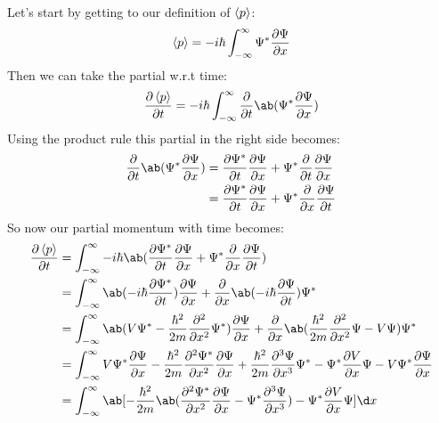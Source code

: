 Let's start by getting to our definition of $\braket{p}$:
\begin{equation}
    \braket{p} = -i\hbar\int_{-\infty}^{\infty}\Psi^*\pdv{\Psi}{x}
\end{equation}
Then we can take the partial w.r.t time:
\begin{equation}
    \pdv{\braket{p}}{t} = -i\hbar\int_{-\infty}^{\infty}\pdv{}{t}\ab(\Psi^*\pdv{\Psi}{x})
\end{equation}
Using the product rule this partial in the right side becomes:
\begin{align}
    \pdv*{\ab(\Psi^*\pdv{\Psi}{x})}{t} &= \pdv{\Psi^*}{t}\pdv{\Psi}{x} + \Psi^*\pdv*{\pdv{\Psi}{x}}{t}\\
    &= \pdv{\Psi^*}{t}\pdv{\Psi}{x} + \Psi^*\pdv*{\pdv{\Psi}{t}}{x}
\end{align}
So now our partial momentum with time becomes:
\begin{align}
    \pdv{\braket{p}}{t} &= \int_{-\infty}^{\infty}-i\hbar\ab( \pdv{\Psi^*}{t}\pdv{\Psi}{x} + \Psi^*\pdv*{\pdv{\Psi}{t}}{x})\\
    &= \int_{-\infty}^{\infty}\ab(-i\hbar\pdv{\Psi^*}{t})\pdv{\Psi}{x} + \pdv*{\ab(-i\hbar\pdv{\Psi}{t})}{x}\Psi^*\\
    &= \int_{-\infty}^{\infty}\ab(V\Psi^* - \frac{\hbar^2}{2m} \pdv[order=2]{}{x}\Psi^*)\pdv{\Psi}{x} + \pdv{}{x}\ab(\frac{\hbar^2}{2m}\pdv[order=2]{}{x}\Psi - V\Psi)\Psi^*\\
    &= \int_{-\infty}^{\infty}V\Psi^*\pdv{\Psi}{x} - \frac{\hbar^2}{2m} \pdv[order=2]{\Psi^*}{x}\pdv{\Psi}{x} + \frac{\hbar^2}{2m}\pdv[order=3]{\Psi}{x}\Psi^*-\Psi^*\pdv{V}{x}\Psi -V\Psi^*\pdv{\Psi}{x} \\
    &= \int_{-\infty}^{\infty}\ab[-\frac{\hbar^2}{2m}\ab(\pdv[order=2]{\Psi^*}{x}\pdv{\Psi}{x}-\Psi^*\pdv[order=3]{\Psi}{x})-\Psi^*\pdv{V}{x}\Psi]\d x
\end{align}

